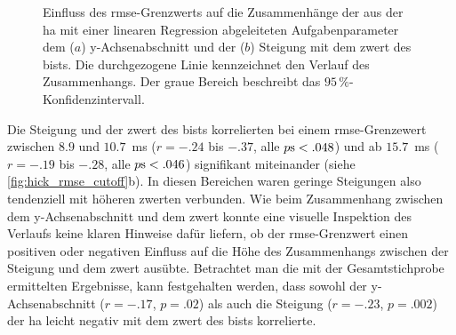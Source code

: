 \documentclass[11pt, twoside, a4paper]{book}		%
\begin{document}
\begin{figure}[htbp]
	\centering
	\begin{adjustbox}{width=1\textwidth}
	\end{adjustbox}
	\newline
	\begin{adjustbox}{width=1\textwidth}
	\end{adjustbox}
	
	\caption[Einfluss des \gls{rmse}-Grenzwerts der \gls{ha} auf den Zusammenhang zwischen dem y-Ach\-sen\-ab\-schnitt, der Steigung und dem \gls{zwert} des \gls{bist}s]{Einfluss des \gls{rmse}-Grenzwerts auf die Zusammenhänge der aus der \gls{ha} mit einer linearen Regression abgeleiteten Aufgabenparameter dem ($a$) y-Ach\-sen\-ab\-schnitt und der ($b$) Steigung mit dem \gls{zwert} des \gls{bist}s. Die durchgezogene Linie kennzeichnet den Verlauf des Zusammenhangs. Der graue Bereich beschreibt das $95\,\%$-Konfidenzintervall.}
	\label{fig:hick_rmse_cutoff}
\end{figure}

Die Steigung und der \gls{zwert} des \gls{bist}s korrelierten bei einem \gls{rmse}-Grenzewert zwischen $8.9$ und $10.7$~ms ($r = -.24$ bis $ -.37$, alle $p\textnormal{s} < .048$) und ab $15.7$~ms ($r = -.19$ bis $ -.28$, alle $p\textnormal{s} < .046$) signifikant miteinander (siehe \autoref{fig:hick_rmse_cutoff}b). In diesen Bereichen waren geringe Steigungen also tendenziell mit höheren \gls{zwert}en verbunden. Wie beim Zusammenhang zwischen dem y-Ach\-sen\-ab\-schnitt und dem \gls{zwert} konnte eine visuelle Inspektion des Verlaufs keine klaren Hinweise dafür liefern, ob der \gls{rmse}-Grenzwert einen positiven oder negativen Einfluss auf die Höhe des Zusammenhangs zwischen der Steigung und dem \gls{zwert} ausübte.
Betrachtet man die mit der Gesamtstichprobe ermittelten Ergebnisse, kann festgehalten werden, dass sowohl der y-Ach\-sen\-ab\-schnitt ($r=-.17$, $p=.02$) als auch die Steigung ($r=-.23$, $p=.002$) der \gls{ha} leicht negativ mit dem \gls{zwert} des \gls{bist}s korrelierte. %
\end{document}
